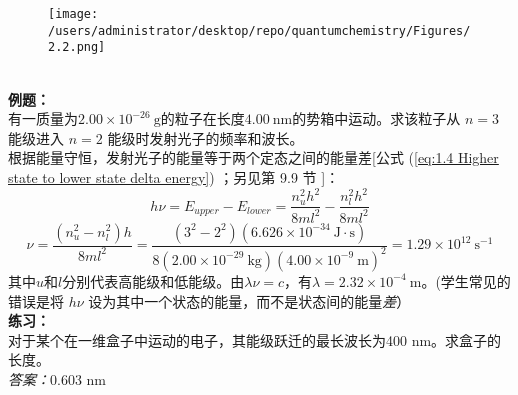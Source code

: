 	\begin{figure}[h!]
		\centering
		\texttt{[image: /users/administrator/desktop/repo/quantumchemistry/Figures/2.2.png]}  %
		\caption{}
		\label{fig:2.2}
	\end{figure}
	\\
	\textbf{例题：}\\
	有一质量为$2.00\times10^{-26}\: \mathrm{g}$的粒子在长度$4.00 \: \mathrm{nm}$的势箱中运动。求该粒子从 $n=3$ 能级进入 $n=2$ 能级时发射光子的频率和波长。\\
	\indent 根据能量守恒，发射光子的能量等于两个定态之间的能量差[公式 (\ref{eq:1.4 Higher state to lower state delta energy}) ；另见第 9.9 节 ]：
	\begin{equation*}
		h\nu = E_{upper}-E_{lower}=\frac{n_u^2h^2}{8ml^2} - \frac{n_l^2h^2}{8ml^2}
	\end{equation*}
	\begin{equation*}
		\nu = \frac{\left(n_u^2-n_l^2\right)h}{8ml^2} = \frac{\left(3^2-2^2\right)\left(6.626 \times 10^{-34} \: \mathrm{J}\cdot\mathrm{s}\right)}{8\left(2.00 \times 10^{-29} \:  \mathrm{kg}\right)\left(4.00 \times 10^{-9} \: \mathrm{m}\right)^2} = 1.29 \times 10^{12} \: \mathrm{s}^{-1}
	\end{equation*}
	其中$u$和$l$分别代表高能级和低能级。由$\lambda \nu =c$，有$\lambda = 2.32 \times 10^{-4} \: \mathrm{m}$。(学生常见的错误是将 $h\nu$ 设为其中一个状态的能量，而不是状态间的能量\textit{差}）\\
	\textbf{练习：}\\
	对于某个在一维盒子中运动的电子，其能级跃迁的最长波长为400 nm。求盒子的长度。\\
	\textit{答案：}0.603 nm\\
	
